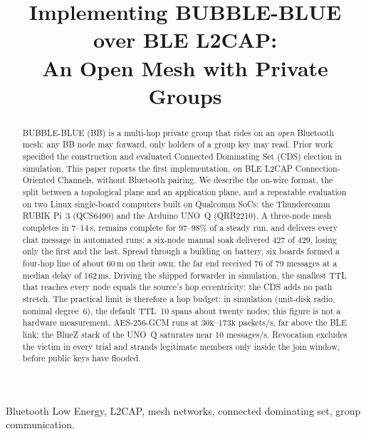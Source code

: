 \documentclass[conference,10pt]{IEEEtran}
\begin{document}
\title{Implementing BUBBLE-BLUE over BLE L2CAP:\\
An Open Mesh with Private Groups}

\author{
\and
{}
}

\maketitle

\begin{abstract}
BUBBLE-BLUE (BB) is a multi-hop private group that rides on an \emph{open}
Bluetooth mesh: any BB node may forward, only holders of a group key may
read. Prior work specified the construction and evaluated Connected
Dominating Set (CDS) election in simulation. This paper reports the first
implementation, on BLE L2CAP Connection-Oriented Channels, without
Bluetooth pairing. We describe the on-wire format, the split between a
topological plane and an application plane, and a repeatable evaluation on
two Linux single-board computers built on Qualcomm SoCs: the Thundercomm
RUBIK Pi~3 (QCS6490) and the Arduino UNO~Q (QRB2210). A three-node mesh
completes in 7--14\,s, remains complete for 97--98\% of a steady run, and
delivers every chat message in automated runs; a six-node manual soak
delivered 427 of 429, losing only the first and the last. Spread through a building on battery, six boards
formed a four-hop line of about 60\,m on their own; the far end received
76 of 79 messages at a median delay of 162\,ms. Driving the shipped
forwarder in simulation, the smallest TTL that reaches every node equals
the source's hop eccentricity: the CDS adds no path stretch. The practical
limit is therefore a hop budget: in simulation (unit-disk radio, nominal
degree~6), the default TTL~10 spans about twenty nodes; this figure is
not a hardware measurement. AES-256-GCM runs at
$30\text{k}$--$173\text{k}$ packets/s, far above the BLE link; the BlueZ
stack of the UNO~Q saturates near 10 messages/s. Revocation excludes the
victim in every trial and strands legitimate members only inside the join
window, before public keys have flooded.
\end{abstract}

\begin{IEEEkeywords}
Bluetooth Low Energy, L2CAP, mesh networks, connected dominating set,
group communication.
\end{IEEEkeywords}
\end{document}
